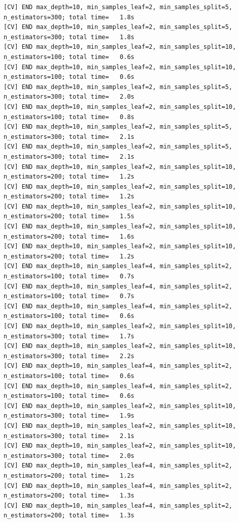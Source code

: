 \documentclass[
  11pt,
  letterpaper,
  DIV=11,
  numbers=noendperiod]{scrartcl}
\begin{document}
\begin{verbatim}
[CV] END max_depth=10, min_samples_leaf=2, min_samples_split=5, n_estimators=300; total time=   1.8s
[CV] END max_depth=10, min_samples_leaf=2, min_samples_split=5, n_estimators=300; total time=   1.8s
[CV] END max_depth=10, min_samples_leaf=2, min_samples_split=10, n_estimators=100; total time=   0.6s
[CV] END max_depth=10, min_samples_leaf=2, min_samples_split=10, n_estimators=100; total time=   0.6s
[CV] END max_depth=10, min_samples_leaf=2, min_samples_split=5, n_estimators=300; total time=   2.0s
[CV] END max_depth=10, min_samples_leaf=2, min_samples_split=10, n_estimators=100; total time=   0.8s
[CV] END max_depth=10, min_samples_leaf=2, min_samples_split=5, n_estimators=300; total time=   2.1s
[CV] END max_depth=10, min_samples_leaf=2, min_samples_split=5, n_estimators=300; total time=   2.1s
[CV] END max_depth=10, min_samples_leaf=2, min_samples_split=10, n_estimators=200; total time=   1.2s
[CV] END max_depth=10, min_samples_leaf=2, min_samples_split=10, n_estimators=200; total time=   1.2s
[CV] END max_depth=10, min_samples_leaf=2, min_samples_split=10, n_estimators=200; total time=   1.5s
[CV] END max_depth=10, min_samples_leaf=2, min_samples_split=10, n_estimators=200; total time=   1.6s
[CV] END max_depth=10, min_samples_leaf=2, min_samples_split=10, n_estimators=200; total time=   1.2s
[CV] END max_depth=10, min_samples_leaf=4, min_samples_split=2, n_estimators=100; total time=   0.7s
[CV] END max_depth=10, min_samples_leaf=4, min_samples_split=2, n_estimators=100; total time=   0.7s
[CV] END max_depth=10, min_samples_leaf=4, min_samples_split=2, n_estimators=100; total time=   0.6s
[CV] END max_depth=10, min_samples_leaf=2, min_samples_split=10, n_estimators=300; total time=   1.7s
[CV] END max_depth=10, min_samples_leaf=2, min_samples_split=10, n_estimators=300; total time=   2.2s
[CV] END max_depth=10, min_samples_leaf=4, min_samples_split=2, n_estimators=100; total time=   0.6s
[CV] END max_depth=10, min_samples_leaf=4, min_samples_split=2, n_estimators=100; total time=   0.6s
[CV] END max_depth=10, min_samples_leaf=2, min_samples_split=10, n_estimators=300; total time=   1.9s
[CV] END max_depth=10, min_samples_leaf=2, min_samples_split=10, n_estimators=300; total time=   2.1s
[CV] END max_depth=10, min_samples_leaf=2, min_samples_split=10, n_estimators=300; total time=   2.0s
[CV] END max_depth=10, min_samples_leaf=4, min_samples_split=2, n_estimators=200; total time=   1.2s
[CV] END max_depth=10, min_samples_leaf=4, min_samples_split=2, n_estimators=200; total time=   1.3s
[CV] END max_depth=10, min_samples_leaf=4, min_samples_split=2, n_estimators=200; total time=   1.3s

\end{verbatim}
\end{document}
